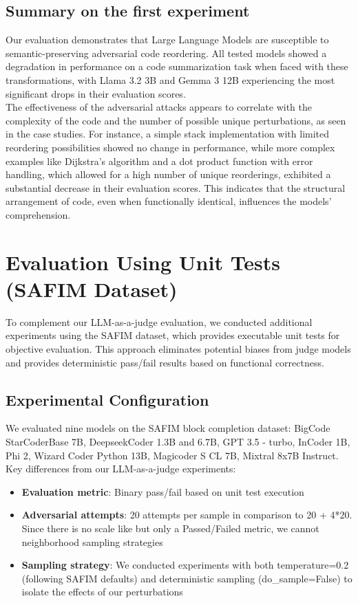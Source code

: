 \documentclass[%
thesis=student,%
coverpage=false,%
titlepage=false,%
headmarks=true, %
english,%
font=libertine, %
math=newpxtx, %
BCOR=5mm,%
coverBCOR=11mm%
]{tum-templates/book/tumbook}
\begin{document}
\subsection{Summary on the first experiment}

Our evaluation demonstrates that Large Language Models are susceptible to semantic-preserving adversarial code reordering. All tested models showed a degradation in performance on a code summarization task when faced with these transformations, with Llama 3.2 3B and Gemma 3 12B experiencing the most significant drops in their evaluation scores. \\
The effectiveness of the adversarial attacks appears to correlate with the complexity of the code and the number of possible unique perturbations, as seen in the case studies. For instance, a simple stack implementation with limited reordering possibilities showed no change in performance, while more complex examples like Dijkstra's algorithm and a dot product function with error handling, which allowed for a high number of unique reorderings, exhibited a substantial decrease in their evaluation scores. This indicates that the structural arrangement of code, even when functionally identical, influences the models' comprehension.

\section{Evaluation Using Unit Tests (SAFIM Dataset)}

To complement our LLM-as-a-judge evaluation, we conducted additional experiments using the SAFIM dataset, which provides executable unit tests for objective evaluation. This approach eliminates potential biases from judge models and provides deterministic pass/fail results based on functional correctness.

\subsection{Experimental Configuration}

We evaluated nine models on the SAFIM block completion dataset: BigCode StarCoderBase 7B, DeepseekCoder 1.3B and 6.7B, GPT 3.5 - turbo, InCoder 1B, Phi 2, Wizard Coder Python 13B, Magicoder S CL 7B,
Mixtral 8x7B Instruct.
Key differences from our LLM-as-a-judge experiments:
\begin{itemize}
    \item \textbf{Evaluation metric}: Binary pass/fail based on unit test execution
    \item \textbf{Adversarial attempts}: 20 attempts per sample in comparison to 20 + 4*20. Since there is no scale like but only a Passed/Failed metric, we cannot neighborhood sampling strategies
    \item \textbf{Sampling strategy}: We conducted experiments with both temperature=0.2 (following SAFIM defaults) and deterministic sampling (do\_sample=False) to isolate the effects of our perturbations
\end{itemize}
\end{document}
